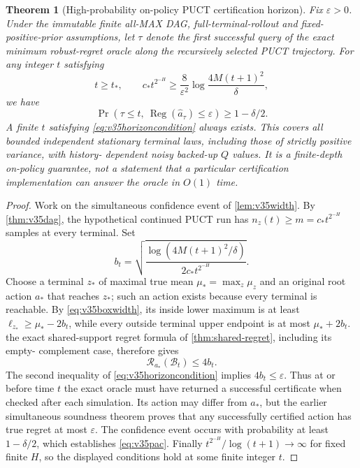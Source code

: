 \documentclass{article}
\theoremstyle{plain}
\newtheorem{theorem}{Theorem}[section]
\theoremstyle{definition}
\begin{document}
\begin{theorem}[High-probability on-policy PUCT certification horizon]
\label{thm:v35horizon}
Fix $\varepsilon>0$. Under the immutable finite all-MAX DAG,
full-terminal-rollout and fixed-positive-prior assumptions, let
$\tau$ denote the first successful query of the \emph{exact}
minimum robust-regret oracle along the recursively selected PUCT trajectory.
For any integer $t$ satisfying
\begin{equation}
 \boxed{\qquad
 t\ge t_*,\qquad
 c_*t^{2^{-H}}
 \ge\frac{8}{\varepsilon^2}
  \log\frac{4M(t+1)^2}{\delta},
 \qquad}
 \label{eq:v35horizoncondition}
\end{equation}
we have
\begin{equation}
 \boxed{\quad
 \Pr\!\left(\tau\le t,\ \operatorname{Reg}(\widehat a_\tau)\le\varepsilon\right)
 \ge1-\delta/2.\quad}
 \label{eq:v35pac}
\end{equation}
A finite $t$ satisfying \eqref{eq:v35horizoncondition} always exists.
This covers all bounded independent stationary terminal laws,
including those of \emph{strictly positive variance}, with history-
dependent noisy backed-up $Q$ values. It is a finite-depth
on-policy guarantee, not a statement that a particular certification
implementation can answer the oracle in $O(1)$ time.
\end{theorem}
\begin{proof}
Work on the simultaneous confidence event of \cref{lem:v35width}.
By \cref{thm:v35dag}, the hypothetical continued PUCT run has
$n_z(t)\ge m=c_*t^{2^{-H}}$ samples at every terminal. Set
\[
 b_t=\sqrt{\frac{\log(4M(t+1)^2/\delta)}
                  {2c_*t^{2^{-H}}}}.
\]
Choose a terminal $z_*$ of maximal true mean
$\mu_*=\max_z\mu_z$ and an original root action $a_*$ that
reaches $z_*$; such an action exists because every terminal is
reachable. By \eqref{eq:v35boxwidth}, its inside lower maximum
is at least $\ell_{z_*}\ge\mu_*-2b_t$, while every outside
terminal upper endpoint is at most $\mu_*+2b_t$.
the exact shared-support regret formula of \cref{thm:shared-regret}, including its empty-
complement case, therefore gives
\[
 \mathcal R_{a_*}(\mathcal B_t)\le4b_t.
\]
The second inequality of \eqref{eq:v35horizoncondition} implies
$4b_t\le\varepsilon$. Thus at or before time $t$ the exact oracle
must have returned a successful certificate when checked after each
simulation. Its action may differ from $a_*$, but the earlier simultaneous
soundness theorem proves that any successfully certified action has
true regret at most $\varepsilon$. The confidence event occurs with
probability at least $1-\delta/2$, which establishes
\eqref{eq:v35pac}. Finally $t^{2^{-H}}/\log(t+1)\to\infty$
for fixed finite $H$, so the displayed conditions hold at some
finite integer $t$.
\end{proof}
\end{document}

